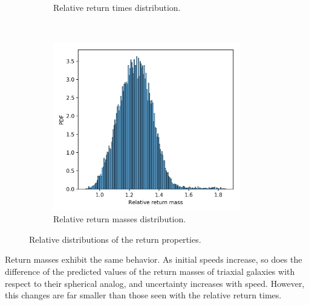 \begin{figure}[h!]
\begin{subfigure}[b]{0.49\textwidth}
			\caption{Relative return times distribution.}
			\label{fig: relTimeDist}
		\end{subfigure}
		~ 
		\begin{subfigure}[b]{0.49\textwidth}
			\includegraphics[width = 0.9\textwidth]{"../Files/Week 14/relative_mass_dist"}
			\caption{Relative return masses distribution.}
			\label{fig: relMassDist}
		\end{subfigure}
		\caption{Relative distributions of the return properties.}
		\label{fig: relatives}
	\end{figure}

	Return masses exhibit the same behavior. As initial speeds increase, so does the difference of the predicted values of the return masses of triaxial galaxies with respect to their spherical analog, and uncertainty increases with speed. However, this changes are far smaller than those seen with the relative return times.
	
